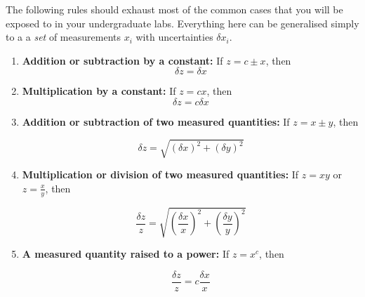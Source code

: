 \begin{tip}
The following rules should exhaust most of the common cases that you will be exposed to in your undergraduate labs. Everything here can be generalised simply to a a \textit{set} of measurements $x_i$ with uncertainties $\delta x_i$.

\begin{enumerate}
    \item \textbf{Addition or subtraction by a constant:} If $z = c \pm x$, then 
    \begin{equation}
        \delta z = \delta x
    \end{equation}
    
    
    \item \textbf{Multiplication by a constant:} If $z = c x$, then 
    \begin{equation}
        \delta z = c\delta x
    \end{equation}
    
    \item \textbf{Addition or subtraction of two measured quantities:} If $z = x \pm y$, then 
    
    \begin{equation}
        \delta z = \sqrt{(\delta x)^2 +(\delta y)^2}
    \end{equation}
    
    \item \textbf{Multiplication or division of two measured quantities:} If $z = xy$ or $z = \frac{x}{y}$, then 
    
    \begin{equation}
        \frac{\delta z}{z} = \sqrt{\left(\frac{\delta x}{x}\right)^2 + \left(\frac{\delta y}{y} \right)^2}
        \label{relerror}
    \end{equation}
    
    \item \textbf{A measured quantity raised to a power:} If $z = x^c$, then
    
    \begin{equation}
        \frac{\delta z}{z} = c \frac{\delta x}{x}
        \label{powerror}
    \end{equation}
    
\end{enumerate}
\end{tip}

